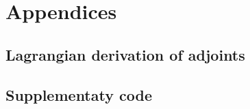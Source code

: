 \documentclass[12pt]{article}
\begin{document}

% 

\newpage
\appendix
\section*{Appendices}
\renewcommand{\thesubsection}{\Alph{subsection}}

\subsection{Lagrangian derivation of adjoints}


\subsection{Supplementaty code}



\newpage

\printbibliography[heading=bibintoc, title={References}]
\end{document}

